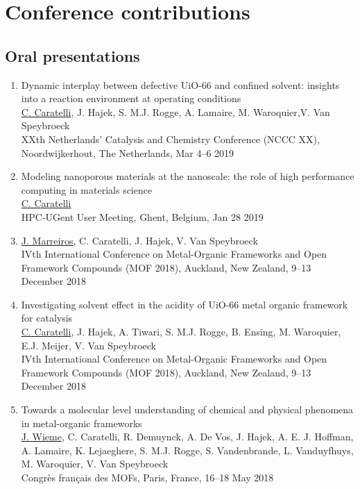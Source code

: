 \section*{Conference contributions}
\subsection*{Oral presentations}
\begin{enumerate}

\item
Dynamic interplay between defective UiO-66 and confined solvent: insights into a reaction environment at operating conditions\\
\underline{C. Caratelli}, J. Hajek, S. M.J. Rogge, A. Lamaire, M. Waroquier,V. Van Speybroeck\\
XXth Netherlands' Catalysis and Chemistry Conference (NCCC XX), Noordwijkerhout, The Netherlands, Mar 4--6 2019

\item
Modeling nanoporous materials at the nanoscale: the role of high performance computing in materials science\\
\underline{C. Caratelli}\\
HPC-UGent User Meeting, Ghent, Belgium, Jan 28 2019

\item
{}
\underline{J. Marreiros}, C. Caratelli, J. Hajek, V. Van Speybroeck\\
IVth International Conference on Metal-Organic Frameworks and Open Framework Compounds (MOF 2018),
Auckland, New Zealand, 9--13 December 2018

\item
Investigating solvent effect in the acidity of UiO-66 metal organic framework for catalysis\\
\underline{C. Caratelli}, J. Hajek, A. Tiwari, S. M.J. Rogge, B. Ensing, M. Waroquier, E.J. Meijer, V. Van Speybroeck\\
IVth International Conference on Metal-Organic Frameworks and Open Framework Compounds (MOF 2018),
Auckland, New Zealand, 9--13 December 2018

\item
Towards a molecular level understanding of chemical and physical phenomena in metal-organic
frameworks\\
\underline{J. Wieme}, C. Caratelli, R. Demuynck, A. De Vos, J. Hajek, A. E. J. Hoffman, A. Lamaire, K. Lejaeghere, S. M.J. Rogge, S. Vandenbrande, L. Vanduyfhuys, M. Waroquier, V. Van Speybroeck\\
Congrès français des MOFs, Paris, France, 16--18 May 2018


\end{enumerate}
